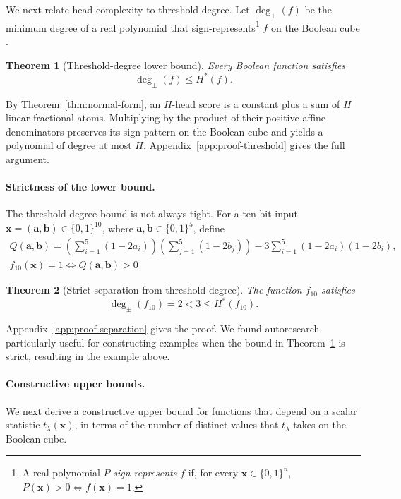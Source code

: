 \documentclass{article}
\newtheorem{theorem}{Theorem}
\theoremstyle{definition}
\theoremstyle{plain}
\newcommand{\hstar}{H^{\ast}}
\newcommand{\tdeg}{\deg_{\pm}}
\newcommand{\bits}{\{0,1\}}
\begin{document}
We next relate head complexity to threshold degree. Let $\tdeg(f)$ be the minimum degree of a real polynomial that sign-represents\footnote{A real polynomial $P$ \emph{sign-represents} $f$ if, for every $\mathbf{x}\in\bits^n$, $P(\mathbf{x})>0 \Longleftrightarrow f(\mathbf{x})=1$.} $f$ on the Boolean cube \citep{minsky1969perceptrons}.

\begin{theorem}[Threshold-degree lower bound]
\label{thm:threshold}
Every Boolean function satisfies
\begin{equation*}
\tdeg(f)\leq\hstar(f).
\end{equation*}
\end{theorem}
By Theorem~\ref{thm:normal-form}, an $H$-head score is a constant plus a sum of $H$ linear-fractional atoms. Multiplying by the product of their positive affine denominators preserves its sign pattern on the Boolean cube and yields a polynomial of degree at most $H$. Appendix~\ref{app:proof-threshold} gives the full argument.

\paragraph{Strictness of the lower bound.}
The threshold-degree bound is not always tight. For a ten-bit input $\mathbf{x}=(\mathbf{a},\mathbf{b})\in\bits^{10}$, where $\mathbf{a},\mathbf{b}\in\bits^5$, define
\begin{equation}
\begin{gathered}
Q(\mathbf{a},\mathbf{b})=
\left(\sum_{i=1}^{5}(1-2a_i)\right)\left(\sum_{j=1}^{5}(1-2b_j)\right)
-3\sum_{i=1}^{5}\left(1-2a_i\right)\left(1-2b_i\right), \\
f_{10}(\mathbf{x})=1 \Longleftrightarrow Q(\mathbf{a},\mathbf{b})>0
\end{gathered}
\label{eq:f10}
\end{equation}
\begin{theorem}[Strict separation from threshold degree]
\label{thm:separation}
The function $f_{10}$ satisfies
\begin{equation*}
\tdeg(f_{10})=2<3\leq\hstar(f_{10}).
\end{equation*}
\end{theorem}
Appendix~\ref{app:proof-separation} gives the proof. We found autoresearch particularly useful for constructing examples when the bound in Theorem~\ref{thm:threshold} is strict, resulting in the example above.

\paragraph{Constructive upper bounds.}
We next derive a constructive upper bound for functions that depend on a scalar statistic $t_\lambda(\mathbf{x})$, in terms of the number of distinct values that $t_\lambda$ takes on the Boolean cube.
\end{document}

